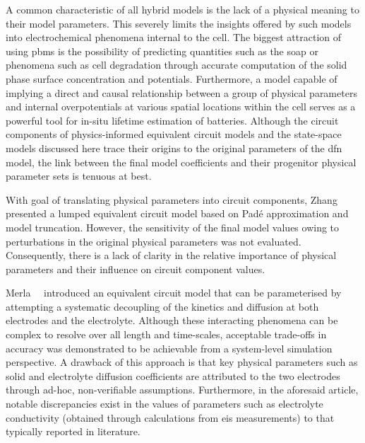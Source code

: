 A  common  characteristic  of all  hybrid  models  is  the  lack of  a  physical
meaning to  their model  parameters. This severely  limits the  insights offered
by  such  models  into  electrochemical  phenomena internal  to  the  cell.  The
biggest  attraction  of  using  \glspl{pbm} is  the  possibility  of  predicting
quantities such as the \gls{soap} or  phenomena such as cell degradation through
accurate computation  of the solid  phase surface concentration  and potentials.
Furthermore,  a model  capable  of  implying a  direct  and causal  relationship
between a  group of physical  parameters and internal overpotentials  at various
spatial locations within the cell serves as a powerful tool for in-situ lifetime
estimation  of batteries.  Although the  circuit components  of physics-informed
equivalent circuit models and the  state-space models discussed here trace their
origins to the original parameters of  the \gls{dfn} model, the link between the
final model coefficients and their progenitor physical parameter sets is tenuous
at best.


With  goal   of  translating   physical  parameters  into   circuit  components,
Zhang~\etal{}~\cite{Zhang2017} presented a lumped equivalent circuit model based
on Padé  approximation and  model truncation. However,  the sensitivity  of the
final model  values owing to  perturbations in the original  physical parameters
was not  evaluated. Consequently,  there is  a lack of  clarity in  the relative
importance  of physical  parameters  and their  influence  on circuit  component
values.


Merla~\etal{}~\cite{Merla2018} introduced  an equivalent circuit model  that can
be  parameterised by  attempting a  systematic  decoupling of  the kinetics  and
diffusion at  both electrodes  and the  electrolyte. Although  these interacting
phenomena can be complex to resolve  over all length and time-scales, acceptable
trade-offs in  accuracy was  demonstrated to be  achievable from  a system-level
simulation  perspective.  A drawback  of  this  approach  is that  key  physical
parameters such as  solid and electrolyte diffusion  coefficients are attributed
to the  two electrodes through ad-hoc,  non-verifiable assumptions. Furthermore,
in  the  aforesaid  article,  notable  discrepancies  exist  in  the  values  of
parameters such as electrolyte  conductivity (obtained through calculations from
\gls{eis} measurements)  to that typically reported  in literature. 


